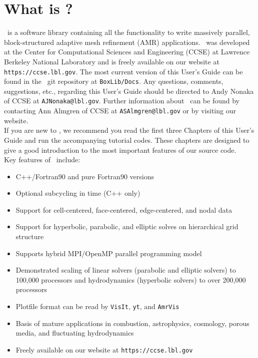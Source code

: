 \section{What is \BoxLib?}

\BoxLib\ is a software library containing all the functionality to write massively parallel, 
block-structured adaptive mesh refinement (AMR) applications.
\BoxLib\ was developed at the Center for Computational Sciences and Engineering (CCSE) at 
Lawrence Berkeley National Laboratory and is freely available on our website
at {\tt https://ccse.lbl.gov}.  The most current version of this User's Guide
can be found in the \BoxLib\ git repository at {\tt BoxLib/Docs}.  Any questions,
comments, suggestions, etc., regarding this User's Guide should be directed
to Andy Nonaka of CCSE at {\tt AJNonaka@lbl.gov}.  Further information 
about \BoxLib\ can be found by contacting Ann Almgren of CCSE at 
{\tt ASAlmgren@lbl.gov} or by visiting our website.\\

If you are new to \BoxLib, we recommend you read the first three Chapters of this User's 
Guide and run the accompanying tutorial codes.  These chapters are designed to give a 
good introduction to the most important features of our source code.\\

Key features of \BoxLib\ include:
\begin{itemize}
\item C++/Fortran90 and pure Fortran90 versions
\item Optional subcycling in time (C++ only)
\item Support for cell-centered, face-centered, edge-centered, and nodal data
\item Support for hyperbolic, parabolic, and elliptic solves on hierarchical grid structure
\item Supports hybrid MPI/OpenMP parallel programming model
\item Demonstrated scaling of linear solvers (parabolic and elliptic solvers) to 100,000 processors and 
      hydrodynamics (hyperbolic solvers) to over 200,000 processors
\item Plotfile format can be read by {\tt VisIt}, {\tt yt}, and {\tt AmrVis}
\item Basis of mature applications in combustion, astrophysics, cosmology, porous media, and fluctuating hydrodynamics
\item Freely available on our website at {\tt https://ccse.lbl.gov}
\end{itemize}

